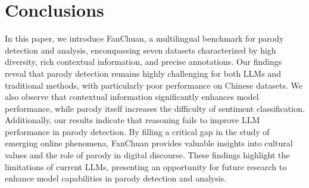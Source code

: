 \vspace{-0.2cm}
\section{Conclusions}
\vspace{-0.2cm}
In this paper, we introduce FanChuan, a multilingual benchmark for parody detection and analysis, encompassing seven datasets characterized by high diversity, rich contextual information, and precise annotations. Our findings reveal that parody detection remains highly challenging for both LLMs and traditional methods, with particularly poor performance on Chinese datasets. We also observe that contextual information significantly enhances model performance, while parody itself increases the difficulty of sentiment classification. Additionally, our results indicate that reasoning fails to improve LLM performance in parody detection. By filling a critical gap in the study of emerging online phenomena, FanChuan provides valuable insights into cultural values and the role of parody in digital discourse. These findings highlight the limitations of current LLMs, presenting an opportunity for future research to enhance model capabilities in parody detection and analysis.
